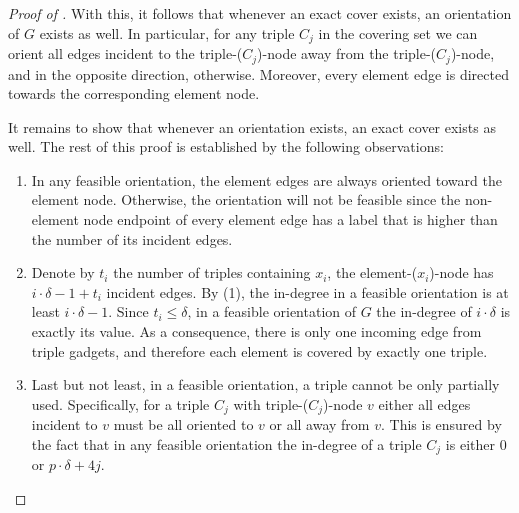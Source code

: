\documentclass[a4paper,UKenglish,cleveref, autoref, thm-restate]{lipics-v2021}
\begin{document}
\begin{proof}[Proof of ]
With this, it follows that whenever an exact cover exists, an orientation of $G$ exists as well. In particular, for any triple $C_j$ in the covering set we can orient all edges incident to the triple-($C_j$)-node away from the triple-($C_j$)-node, and in the opposite direction, otherwise. Moreover, every element edge is directed towards the corresponding element node.

It remains to show that whenever an orientation exists, an exact cover exists as well.
The rest of this proof is established by the following observations:
\begin{enumerate}
    \item In any feasible orientation, the element edges are always oriented toward the element node. Otherwise, the orientation will not be feasible since the non-element node endpoint of every element edge has a label that is higher than the number of its incident edges.
    \item Denote by $t_i$ the number of triples containing $x_i$, the element-($x_i$)-node has $i\cdot\delta-1+t_i$ incident edges. By (1), the in-degree in a feasible orientation is at least $i\cdot\delta-1$. Since $t_i\leq \delta$, in a feasible orientation of $G$ the in-degree of $i\cdot\delta$ is exactly its value. As a consequence, there is only one incoming edge from triple gadgets, and therefore each element is covered by exactly one triple.
    \item Last but not least, in a feasible orientation, a triple cannot be only partially used. Specifically, for a triple $C_j$ with triple-($C_j$)-node $v$ either all edges incident to $v$ must be all oriented to $v$ or all away from $v$. This is ensured by the fact that in any feasible orientation the in-degree of a triple $C_j$ is either $0$ or $p\cdot\delta +4j$. \qedhere
\end{enumerate}
\end{proof}

\end{document}
